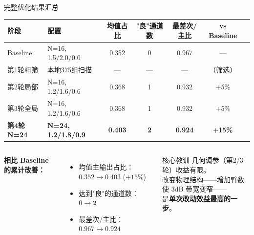 \documentclass[aspectratio=169,10pt]{beamer}
\begin{document}
\begin{frame}{完整优化结果汇总}
  \begin{center}
  \small
  \renewcommand{\arraystretch}{1.35}
  \begin{tabular}{llccccc}
    \toprule
    \textbf{阶段} & \textbf{配置} &
    \textbf{均值占比} & \textbf{"良"通道数} & \textbf{最差次/主比} &
    \textbf{vs Baseline} \\
    \midrule
    Baseline   & N=16, 1.5/2.0/0.0 & 0.352 & 0 & 0.967 & — \\
    第1轮粗筛  & 本地375组扫描     & —     & — & —     & （筛选）\\
    第2轮局部  & N=16, 1.2/1.6/0.6 & 0.368 & 1 & 0.932 & $+$5\% \\
    第3轮全局  & N=16, 1.2/1.6/0.6 & 0.368 & 1 & 0.932 & $+$5\% \\
    \rowcolor{uw_gold!50}
    \textbf{第4轮 N=24} & \textbf{N=24, 1.2/1.8/0.9} & \textbf{0.403} &
    \textbf{2} & \textbf{0.924} & \textbf{$+$15\%} \\
    \bottomrule
  \end{tabular}
  \end{center}
  \vspace{4pt}
  \begin{columns}[T]
      \small\textbf{相比 Baseline 的累计改善：}
      \begin{itemize}\setlength\itemsep{2pt}
        \item 均值主输出占比：$0.352\to\mathbf{0.403}$ \;($+15\%$)
        \item 达到"良"的通道数：$0\to\mathbf{2}$
        \item 最差次/主比：$0.967\to\mathbf{0.924}$
      \end{itemize}
      \begin{block}{\small 核心教训}
        \small 几何调参（第2/3轮）收益有限。\\
        改变物理结构——增加臂数使 3dB 带宽变窄——\\
        是\textbf{单次改动效益最高的一步}。
      \end{block}
  \end{columns}
\end{frame}
\end{document}
